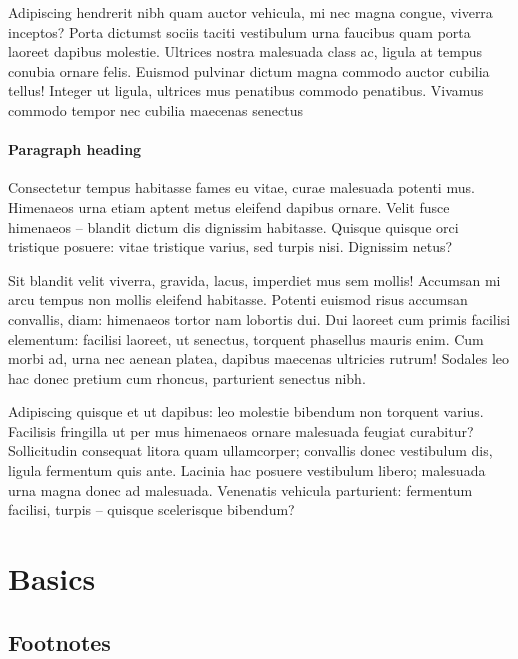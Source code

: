 \documentclass[
12pt,
a4paper,
twoside,
]{article}
\begin{document}
Adipiscing hendrerit nibh quam auctor vehicula, mi nec magna congue,
viverra inceptos? Porta dictumst sociis taciti vestibulum urna faucibus
quam porta laoreet dapibus molestie. Ultrices nostra malesuada class ac,
ligula at tempus conubia ornare felis. Euismod pulvinar dictum magna
commodo auctor cubilia tellus! Integer ut ligula, ultrices mus penatibus
commodo penatibus. Vivamus commodo tempor nec cubilia maecenas senectus

\paragraph{Paragraph heading}\label{paragraph-heading}

Consectetur tempus habitasse fames eu vitae, curae malesuada potenti
mus. Himenaeos urna etiam aptent metus eleifend dapibus ornare. Velit
fusce himenaeos -- blandit dictum dis dignissim habitasse. Quisque
quisque orci tristique posuere: vitae tristique varius, sed turpis nisi.
Dignissim netus?

Sit blandit velit viverra, gravida, lacus, imperdiet mus sem mollis!
Accumsan mi arcu tempus non mollis eleifend habitasse. Potenti euismod
risus accumsan convallis, diam: himenaeos tortor nam lobortis dui. Dui
laoreet cum primis facilisi elementum: facilisi laoreet, ut senectus,
torquent phasellus mauris enim. Cum morbi ad, urna nec aenean platea,
dapibus maecenas ultricies rutrum! Sodales leo hac donec pretium cum
rhoncus, parturient senectus nibh.

Adipiscing quisque et ut dapibus: leo molestie bibendum non torquent
varius. Facilisis fringilla ut per mus himenaeos ornare malesuada
feugiat curabitur? Sollicitudin consequat litora quam ullamcorper;
convallis donec vestibulum dis, ligula fermentum quis ante. Lacinia hac
posuere vestibulum libero; malesuada urna magna donec ad malesuada.
Venenatis vehicula parturient: fermentum facilisi, turpis -- quisque
scelerisque bibendum?

\section{Basics}\label{basics}

\subsection{Footnotes}\label{footnotes}
\end{document}
